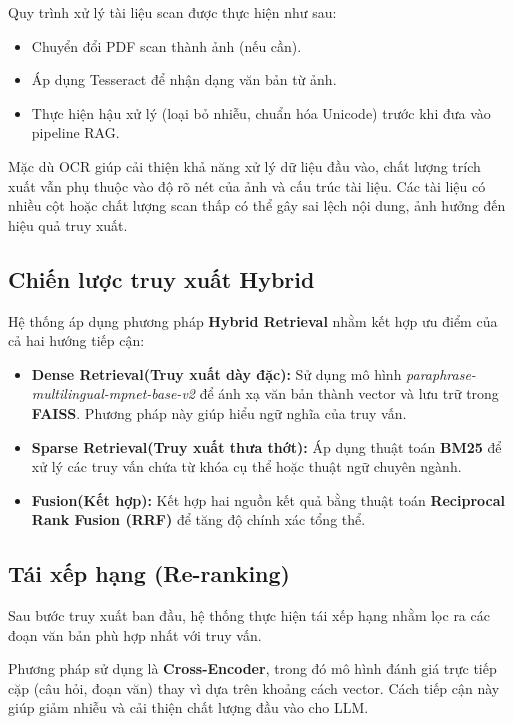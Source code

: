 ﻿\documentclass[10pt, conference, a4paper, compsocconf]{IEEEtran}
\begin{document}
Quy trình xử lý tài liệu scan được thực hiện như sau:
\begin{itemize}
    \item Chuyển đổi PDF scan thành ảnh (nếu cần).
    \item Áp dụng Tesseract để nhận dạng văn bản từ ảnh.
    \item Thực hiện hậu xử lý (loại bỏ nhiễu, chuẩn hóa Unicode) trước khi đưa vào pipeline RAG.
\end{itemize}

Mặc dù OCR giúp cải thiện khả năng xử lý dữ liệu đầu vào, chất lượng trích xuất vẫn phụ thuộc vào độ rõ nét của ảnh và cấu trúc tài liệu. Các tài liệu có nhiều cột hoặc chất lượng scan thấp có thể gây sai lệch nội dung, ảnh hưởng đến hiệu quả truy xuất.
\subsection{Chiến lược truy xuất Hybrid}

Hệ thống áp dụng phương pháp \textbf{Hybrid Retrieval} nhằm kết hợp ưu điểm của cả hai hướng tiếp cận:

\begin{itemize}
    \item \textbf{Dense Retrieval(Truy xuất dày đặc):} Sử dụng mô hình \textit{paraphrase-multilingual-mpnet-base-v2} để ánh xạ văn bản thành vector và lưu trữ trong \textbf{FAISS}. Phương pháp này giúp hiểu ngữ nghĩa của truy vấn.
    
    \item \textbf{Sparse Retrieval(Truy xuất thưa thớt):} Áp dụng thuật toán \textbf{BM25} để xử lý các truy vấn chứa từ khóa cụ thể hoặc thuật ngữ chuyên ngành.
    
    \item \textbf{Fusion(Kết hợp):} Kết hợp hai nguồn kết quả bằng thuật toán \textbf{Reciprocal Rank Fusion (RRF)} để tăng độ chính xác tổng thể.
\end{itemize}

\subsection{Tái xếp hạng (Re-ranking)}

Sau bước truy xuất ban đầu, hệ thống thực hiện tái xếp hạng nhằm lọc ra các đoạn văn bản phù hợp nhất với truy vấn.

Phương pháp sử dụng là \textbf{Cross-Encoder}, trong đó mô hình đánh giá trực tiếp cặp (câu hỏi, đoạn văn) thay vì dựa trên khoảng cách vector. Cách tiếp cận này giúp giảm nhiễu và cải thiện chất lượng đầu vào cho LLM.
\end{document}
